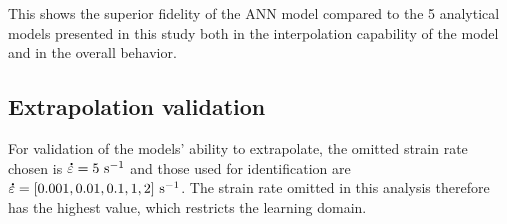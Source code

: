 \documentclass[twoside,english,1p,final,sort&compress]{elsarticle}
\theoremstyle{plain}
\DeclareRobustCommand{\mdot}[1]{\accentset{\mbox{\bfseries .}}{#1}}
\DeclareRobustCommand{\ps}{\text{s}^{-1}}
\begin{document}
This shows the superior fidelity of the ANN model compared to the 5 analytical models presented in this study both in the interpolation capability of the model and in the overall behavior.

\subsection{Extrapolation validation}

For validation of the models' ability to extrapolate, the omitted strain rate chosen is $\mdot\varepsilon=5~\ps$ and those used for identification are $\mdot\varepsilon=[0.001, 0.01, 0.1, 1, 2]~\ps$.
The strain rate omitted in this analysis therefore has the highest value, which restricts the learning domain.
\end{document}
